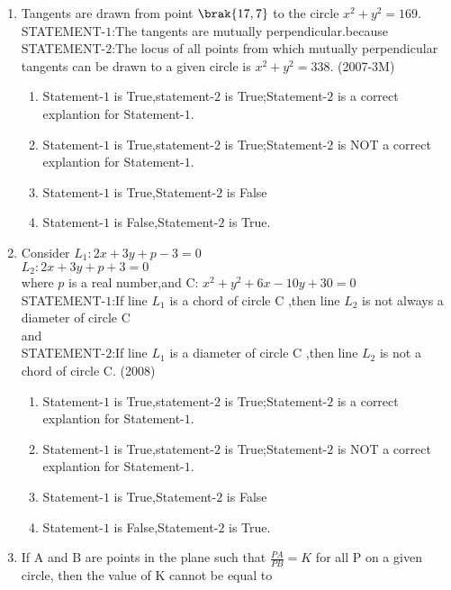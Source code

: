 	\begin{enumerate}
\item Tangents are drawn from point $\brak{17 , 7}$ to the circle $x^2+y^2=169$.\\
STATEMENT-$1$:The tangents are mutually perpendicular.because\\
STATEMENT-$2$:The locus of all points from which mutually perpendicular tangents can be drawn to a given circle is $x^2+y^2=338$. \hfill(2007-3M)\\
\begin{enumerate}
\item Statement-$1$ is True,statement-$2$ is True;Statement-$2$ is a correct explantion for Statement-$1$.
\item Statement-$1$ is True,statement-$2$ is True;Statement-$2$ is NOT a correct explantion for Statement-$1$.
\item Statement-$1$ is True,Statement-$2$ is False
\item Statement-$1$ is False,Statement-$2$ is True.
\end{enumerate}

\item Consider $L_1:2x+3y+p-3=0$\\
               $L_2:2x+3y+p+3=0$\\
where $p$ is a real number,and C: $x^2+y^2+6x-10y+30=0$\\
STATEMENT-$1$:If line $L_1$ is a chord of circle C ,then line $L_2$ is not always a diameter of circle C\\
and\\
STATEMENT-$2$:If line $L_1$ is a diameter of circle C ,then line $L_2$ is not a chord  of circle C. \hfill(2008)\\
\begin{enumerate}
\item Statement-$1$ is True,statement-$2$ is True;Statement-$2$ is a correct explantion for Statement-$1$.
\item Statement-$1$ is True,statement-$2$ is True;Statement-$2$ is NOT a correct explantion for Statement-$1$.
\item Statement-$1$ is True,Statement-$2$ is False
\item Statement-$1$ is False,Statement-$2$ is True.	
\end{enumerate}
	\item If A and B are points in the plane such that        $\frac{PA}{PB}=K$ for all P on a given circle, then the value of K cannot be equal to


\end{enumerate}
